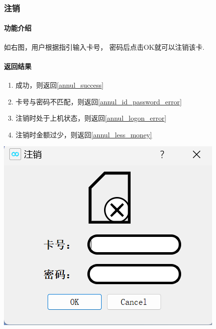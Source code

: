 \documentclass{article}
\begin{document}
    \subsubsection{注销}
    \begin{minipage}[h]{0.5\linewidth}
        \paragraph{功能介绍}
        如右图，用户根据指引输入卡号，
        密码后点击OK就可以注销该卡.
        \vfill
        \paragraph{返回结果}
        \begin{enumerate}
            \item 成功，则返回\ref{annul_success}
            \item 卡号与密码不匹配，则返回\ref{annul_id_password_error}
            \item 注销时处于上机状态，则返回\ref{annul_logon_error}
            \item 注销时金额过少，则返回\ref{annul_less_money}
        \end{enumerate}
    \end{minipage}
    \begin{minipage}[h]{0.5\linewidth}
        \centering
        \includegraphics[scale=0.6]{figure/annul.png}
        \label{annul}
    \end{minipage}
\end{document}

